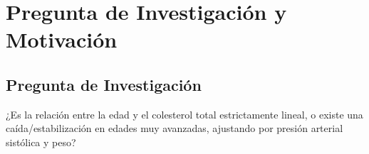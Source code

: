 \section{Pregunta de Investigación y Motivación}

\subsection{Pregunta de Investigación}
¿Es la relación entre la edad y el colesterol total estrictamente lineal, o existe una caída/estabilización en edades muy avanzadas, ajustando por presión arterial sistólica y peso?
